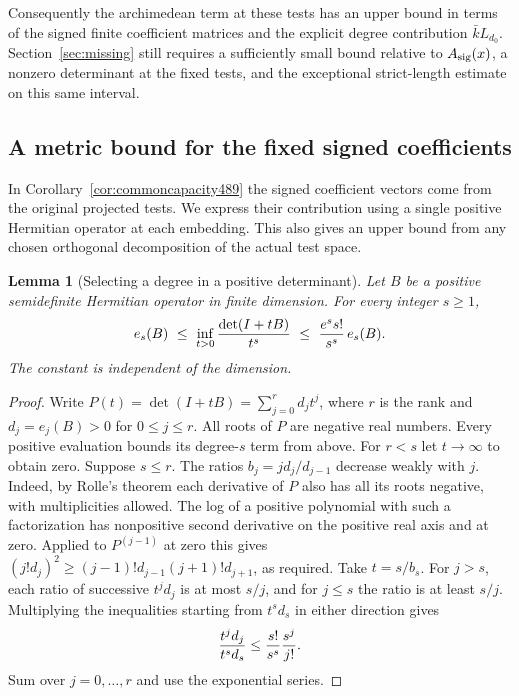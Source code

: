 \documentclass[a4paper,11pt]{article}
\newtheorem{lemma}[proposition]{Lemma}
\theoremstyle{definition}
\theoremstyle{remark}
\numberwithin{equation}{section}
\begin{document}
Consequently the archimedean term at these tests has an upper bound
in terms of the signed finite coefficient matrices and the explicit
degree contribution \(\bar k L_{d_0}\). Section~\ref{sec:missing}
still requires a sufficiently small bound relative to
\(A_{\rm sig}(x)\), a nonzero determinant at the fixed tests, and
the exceptional strict-length estimate on this same interval.


\subsection{A metric bound for the fixed signed coefficients}
\label{sec:dualmetric491}

In Corollary~\ref{cor:commoncapacity489} the signed coefficient
vectors come from the original projected tests. We express their
contribution using a single positive Hermitian operator at each
embedding. This also gives an upper bound from any chosen
orthogonal decomposition of the actual test space.

\begin{lemma}[Selecting a degree in a positive determinant]\leavevmode
\label{lem:selectdegree491}
Let \(B\) be a positive semidefinite Hermitian operator in finite
dimension. For every integer \(s\ge1\),
\[
 e_s(B)\ \le\ \inf_{t>0}{\det(I+tB)\over t^s}
       \ \le\ {e^s s!\over s^s}\, e_s(B).
\]
The constant is independent of the dimension.
\end{lemma}
\begin{proof}
Write \(P(t)=\det(I+tB)=\sum_{j=0}^r d_jt^j\), where \(r\)
is the rank and \(d_j=e_j(B)>0\) for \(0\le j\le r\). All
roots of \(P\) are negative real numbers. Every positive
evaluation bounds its degree-\(s\) term from above. For \(r<s\)
let \(t\to\infty\) to obtain zero. Suppose \(s\le r\).
The ratios \(b_j=jd_j/d_{j-1}\) decrease weakly with \(j\).
Indeed, by Rolle's theorem each derivative of \(P\) also has
all its roots negative, with multiplicities allowed. The log
of a positive polynomial with such a factorization has
nonpositive second derivative on the positive real axis and at
zero. Applied to \(P^{(j-1)}\) at zero this gives
\((j!d_j)^2\ge (j-1)!d_{j-1}(j+1)!d_{j+1}\), as required.
Take \(t=s/b_s\).
For \(j>s\), each ratio of successive \(t^j d_j\) is at most
\(s/j\), and for \(j\le s\) the ratio is at least \(s/j\).
Multiplying the inequalities starting from \(t^s d_s\) in
either direction gives
\[
        {t^j d_j\over t^s d_s}
                  \le {s!\over s^s}{s^j\over j!}.
\]
Sum over \(j=0,\ldots,r\) and use the exponential series.
\end{proof}
\end{document}
